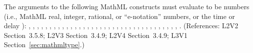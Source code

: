 The arguments to the following MathML constructs must evaluate to be
numbers (i.e., MathML real, integer, rational, or
``e-notation'' numbers, or the time or delay ):
, , , , ,
, , , , ,
, , , ,
, , , , ,
, , , , ,
, , , ,
, , , ,
, , , ,
.  (References: L2V2 Section~3.5.8; L2V3 Section~3.4.9;
L2V4 Section~3.4.9; L3V1 Section~\ref{sec:mathmltype}.)
